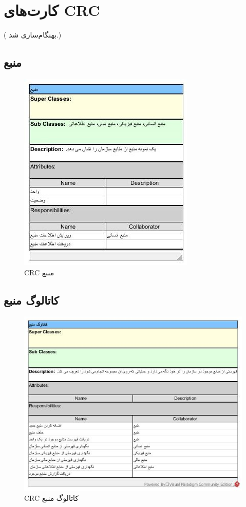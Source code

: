 \chapter{کارت‌های CRC}
({\color{red} بهنگام‌سازی شد.})
\section{منبع}
\begin{figure}[H]
	\centering
	\includegraphics[scale=1]{img/crc/Resource}
	\caption{CRC منبع }
\end{figure}

\section{کاتالوگ منبع}
\begin{figure}[H]
	\centering
	\includegraphics[scale=0.8]{img/crc/ResourceCatalogue}
	\caption{CRC کاتالوگ منبع }
\end{figure}

